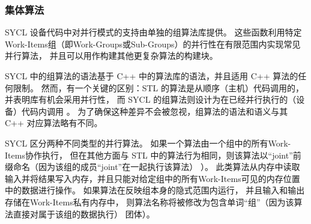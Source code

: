 \subsubsection{集体算法}
SYCL 设备代码中对并行模式的支持由单独的组算法库提供。 
这些函数利用特定Work-Items组（即Work-Groups或Sub-Groups）的并行性在有限范围内实现常见并行算法，
并且可以用作构建其他更复杂算法的构建块。

SYCL 中的组算法的语法基于 C++ 中的算法库的语法，并且适用 C++ 算法的任何限制。 
然而，有一个关键的区别：STL 的算法是从顺序（主机）代码调用的，并表明库有机会采用并行性，
而 SYCL 的组算法则设计为在已经并行执行的（设备）代码内调用 。 
为了确保这种差异不会被忽视，组算法的语法和语义与其 C++ 对应算法略有不同。

SYCL 区分两种不同类型的并行算法。 如果一个算法由一个组中的所有Work-Items协作执行，
但在其他方面与 STL 中的算法行为相同，则该算法以“joint”前缀命名（因为该组的成员“joint”在一起执行该算法） ）。 
此类算法从内存中读取输入并将结果写入内存，并且只能对给定组中的所有Work-Items可见的内存位置中的数据进行操作。 
如果算法在反映组本身的隐式范围内运行，
并且输入和输出存储在Work-Items私有内存中，
则算法名称将被修改为包含单词“组”（因为该算法直接对属于该组的数据执行） 团体）。

